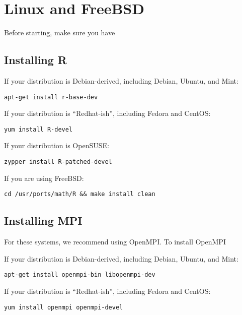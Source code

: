 \section{Linux and FreeBSD}

Before starting, make sure you have 


\subsection{Installing R}

If your distribution is Debian-derived, including Debian, Ubuntu, and Mint:
\begin{lstlisting}[title=Installing OpenMPI on Debian Linux]
apt-get install r-base-dev
\end{lstlisting}

If your distribution is ``Redhat-ish'', including Fedora and CentOS:
\begin{lstlisting}[title=Installing OpenMPI on Fedora Linux]
yum install R-devel
\end{lstlisting}

If your distribution is OpenSUSE:
\begin{lstlisting}[title=Installing OpenMPI on OpenSUSE Linux]
zypper install R-patched-devel
\end{lstlisting}

If you are using FreeBSD:
\begin{lstlisting}[title=Installing OpenMPI on FreeBSD]
cd /usr/ports/math/R && make install clean
\end{lstlisting}


\subsection{Installing MPI}

For these systems, we recommend using OpenMPI.  To install OpenMPI

If your distribution is Debian-derived, including Debian, Ubuntu, and Mint:
\begin{lstlisting}[title=Installing OpenMPI on Debian Linux]
apt-get install openmpi-bin libopenmpi-dev
\end{lstlisting}

If your distribution is ``Redhat-ish'', including Fedora and CentOS:
\begin{lstlisting}[title=Installing OpenMPI on Fedora Linux]
yum install openmpi openmpi-devel
\end{lstlisting}

